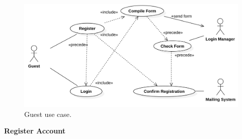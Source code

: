 \documentclass{report}
\begin{document}
\begin{figure}[ht!]
\begin{center}
\includegraphics[width=\textwidth]{./img/UseCase1.png}
\end{center}
\caption{Guest use case.}
\label{fig:UseCase1}
\end{figure}
\begin{center}
	\textbf{Register Account}
\end{center}
\end{document}
